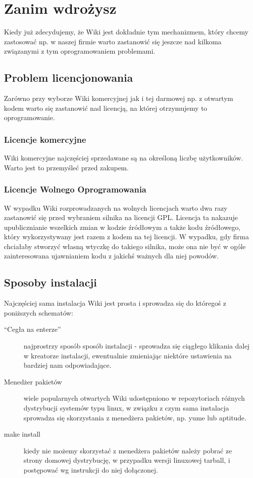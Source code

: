 \documentclass{article}
\begin{document}

\newpage
\section{Zanim wdrożysz}
Kiedy już zdecydujemy, że Wiki jest dokładnie tym mechanizmem, który chcemy zastosować np. w naszej firmie warto zastanowić się jeszcze nad kilkoma związanymi z tym oprogramowaniem problemami.
	\subsection{Problem licencjonowania}
	Zarówno przy wyborze Wiki komercyjnej jak i tej darmowej np. z otwartym kodem warto się zastanowić nad licencją, na której otrzymujemy to oprogramowanie.
	\subsubsection{Licencje komercyjne}
		Wiki komercyjne najczęściej sprzedawane są na określoną liczbę użytkowników. Warto jest to przemyśleć przed zakupem.  
	\subsubsection{Licencje Wolnego Oprogramowania}
		W wypadku Wiki rozprowadzanych na wolnych licencjach warto dwa razy zastanowić się przed wybraniem silnika na licencji GPL. Licencja ta nakazuje upublicznianie wszelkich zmian w kodzie źródłowym a także kodu źródłowego, który wykorzystywany jest razem z kodem na tej licencji. W wypadku, gdy firma chciałaby stworzyć własną wtyczkę do takiego silnika, może ona nie być w ogóle zainteresowana ujawnianiem kodu z jakichś ważnych dla niej powodów. 
	\subsection{Sposoby instalacji}
		Najczęściej sama instalacja Wiki jest prosta i sprowadza się do któregoś z poniższych schematów:		
		\begin{description}
		    \item[``Cegła na enterze''] najprostrzy sposób sposób instalacji - sprowadza się ciągłego klikania dalej w kreatorze instalacji, ewentualnie zmieniając niektóre ustawienia na bardziej nam odpowiadające.
			\item[Menedżer pakietów] wiele popularnych otwartych Wiki udostępniono w repozytoriach różnych dystrybucji systemów typu linux, w związku z czym sama instalacja sprowadza się skorzystania z menedżera pakietów, np. yume lub aptitude.
			\item[make install] kiedy nie możemy skorzystać z menedżera pakietów należy pobrać ze strony domowej dystrybucję, w przypadku wersji linuxowej tarball, i postępować wg instrukcji do niej dołączonej. 
 		\end{description}
\end{document}
